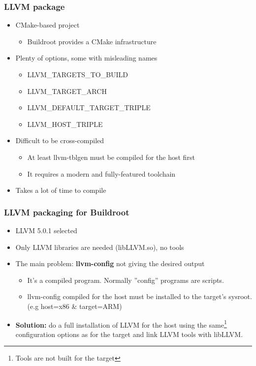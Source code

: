 \documentclass{smilebeamer}
\begin{document}
\begin{frame}
\frametitle{LLVM package}
\begin{itemize}
  \item CMake-based project
  \begin{itemize}
    \item Buildroot provides a CMake infrastructure \smiley
  \end{itemize}
  \item Plenty of options, some with misleading names
  \begin{itemize}
    \item {\selectfont LLVM\_TARGETS\_TO\_BUILD}
    \item {\selectfont LLVM\_TARGET\_ARCH}
    \item {\selectfont LLVM\_DEFAULT\_TARGET\_TRIPLE}
    \item {\selectfont LLVM\_HOST\_TRIPLE}
  \end{itemize}
  \item Difficult to be cross-compiled
  \begin{itemize}
    \item At least llvm-tblgen must be compiled for the host first
    \item It requires a modern and fully-featured toolchain
  \end{itemize}
  \item Takes a lot of time to compile
\end{itemize}
\end{frame}

\begin{frame}
\frametitle{LLVM packaging for Buildroot}
\begin{itemize}
  \item LLVM 5.0.1 selected
  \item Only LLVM libraries are needed (libLLVM.so), no tools
  \item The main problem: \textbf{llvm-config} not giving the desired output
  \begin{itemize}
    \item It's a compiled program. Normally ''config'' programs are scripts.
    \item llvm-config compiled for the host must be installed to the target's
    sysroot. (e.g host=x86 \& target=ARM)
  \end{itemize}
  \item \textbf{Solution:} do a full installation of LLVM for the host using the
  same\footnote{Tools are not built for the target} configuration options as for
  the target and link LLVM tools with libLLVM.
\end{itemize}
\end{frame}
\end{document}
